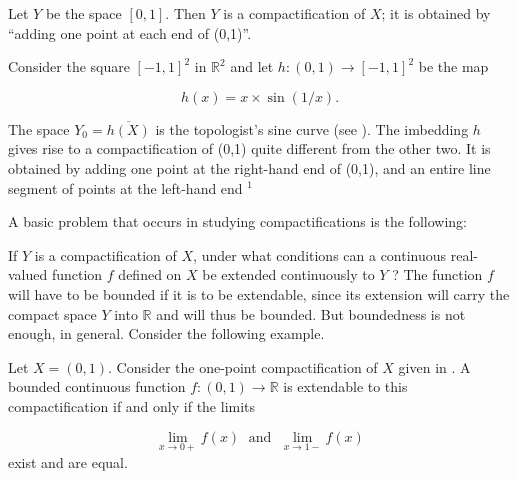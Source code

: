 \begin{centeredblock}
\begin{example}
\label{ex:\thesection.\theexample}
 Let \(Y\) be the space \([ {0,1}]\). Then \(Y\) is a compactification of \(X\); it is obtained by ``adding one point at each end of (0,1)''.
\end{example}
\end{centeredblock}

\begin{centeredblock}
\begin{example}
\label{ex:\thesection.\theexample}
 Consider the square \({[ -1,1] }^{2}\) in \(\mathbb{R}^{2}\) and let \(h : ( {0,1}) \rightarrow {[ -1,1] }^{2}\) be the map

\[
h(x) = x \times \sin ( {1/x}).
\]

The space \(Y_{0} = \overline{h(X) }\) is the topologist's sine curve (see ). The imbedding \(h\) gives rise to a compactification of (0,1) quite different from the other two. It is obtained by adding one point at the right-hand end of (0,1), and an entire line segment of points at the left-hand end \({}^{1}\)
\end{example}
\end{centeredblock}

A basic problem that occurs in studying compactifications is the following:

If \(Y\) is a compactification of \(X\), under what conditions can a continuous real-valued function \(f\) defined on \(X\) be extended continuously to \(Y\) ? The function \(f\) will have to be bounded if it is to be extendable, since its extension will carry the compact space \(Y\) into \(\mathbb{R}\) and will thus be bounded. But boundedness is not enough, in general. Consider the following example.

\begin{centeredblock}
\begin{example}
\label{ex:\thesection.\theexample}
 Let \(X = ( {0,1})\). Consider the one-point compactification of \(X\) given in . A bounded continuous function \(f : ( {0,1}) \rightarrow \mathbb{R}\) is extendable to this compactification if and only if the limits

\[
\mathop{\lim }\limits_{{x \rightarrow 0 + }}f(x) \;\text{ and }\;\mathop{\lim }\limits_{{x \rightarrow 1 - }}f(x)
\]
exist and are equal.
\end{example}
\end{centeredblock}

